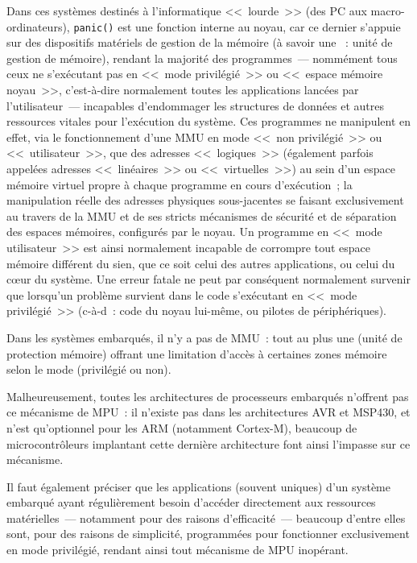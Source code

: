 Dans ces systèmes destinés à l'informatique <<~lourde~>> (des PC
aux macro-ordinateurs), \texttt{panic()} est une fonction interne
au noyau, car ce dernier s'appuie sur des dispositifs matériels de
gestion de la mémoire (à savoir une ~: unité de gestion
de mémoire), rendant la majorité des programmes~--- nommément
tous ceux ne s'exécutant pas en <<~mode privilégié~>> ou <<~espace
mémoire noyau~>>, c'est-à-dire normalement toutes les applications
lancées par l'utilisateur~--- incapables d'endommager les structures
de données et autres ressources vitales pour l'exécution du système.
Ces programmes ne manipulent en effet, via le fonctionnement d'une MMU
en mode <<~non privilégié~>> ou <<~utilisateur~>>, que des adresses
<<~logiques~>> (également parfois appelées adresses <<~linéaires~>> ou
<<~virtuelles~>>) au sein d'un espace mémoire virtuel propre à chaque
programme en cours d'exécution~; la manipulation réelle des adresses
physiques sous-jacentes se faisant exclusivement au travers de la MMU et
de ses stricts mécanismes de sécurité et de séparation des espaces mémoires,
configurés par le noyau. Un programme en <<~mode utilisateur~>> est ainsi
normalement incapable de corrompre tout espace mémoire différent du sien,
que ce soit celui des autres applications, ou  celui du
c{\oe}ur du système.
Une erreur fatale ne peut par conséquent normalement survenir que lorsqu'un
problème survient dans le code s'exécutant en <<~mode privilégié~>>
(c-à-d~: code du noyau lui-même, ou pilotes de périphériques).

\smallskip

Dans les systèmes embarqués, il n'y a pas de MMU~: tout au plus
une  (unité de protection mémoire) offrant une limitation d'accès
à certaines zones mémoire selon le mode (privilégié ou non).

Malheureusement, toutes les architectures de processeurs embarqués
n'offrent pas ce mécanisme de MPU~: il n'existe pas dans les
architectures AVR et MSP430, et n'est qu'optionnel pour les ARM
(notamment Cortex-M), beaucoup de microcontrôleurs implantant cette
dernière architecture font ainsi l'impasse sur ce mécanisme.

Il faut également préciser que les applications (souvent uniques) d'un
système embarqué ayant régulièrement besoin d'accéder directement aux
ressources matérielles~--- notamment pour des raisons d'efficacité~---
beaucoup d'entre elles sont, pour des raisons de simplicité, programmées
pour fonctionner exclusivement en mode privilégié, rendant ainsi tout
mécanisme de MPU inopérant.

